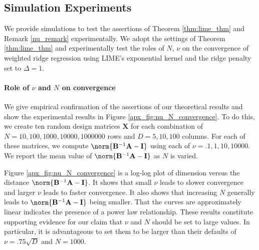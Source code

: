 \documentclass[mnsc,blindrev]{informs3}
\newcommand{\bA}{\mathbf{A}}
\newcommand{\bB}{\mathbf{B}}
\newcommand{\bI}{\mathbf{I}}
\begin{document}
            \subsection*{Simulation Experiments}
                \label{apx_sec:simulation_experiments}
                We provide simulations to test the assertions of Theorem \ref{thm:lime_thm} and Remark \ref{nu_remark} experimentally. We adopt the settings of Theorem \ref{thm:lime_thm} and experimentally test the roles of $N$, $\nu$ on the convergence of weighted ridge regression using LIME's exponential kernel and the ridge penalty set to $\Delta=1$.%
    

                
                \paragraph{Role of $\nu$ and $N$ on convergence}
                    We give empirical confirmation of the assertions of our theoretical results and show the experimental results in Figure \ref{apx_fig:nu_N_convergence}. To do this, we create ten random design matrices $\mathbf{X}$ for each combination of $N=10,100,1000,10000,1000000$ rows and $D=5,10,100$ columns. For each of these matrices, we compute $\norm{\bB^{-1}\bA - \mathbf{I}}$ using each of $\nu=.1,1,10,10000$. We report the mean value of $\norm{\bB^{-1}\bA - \mathbf{I}}$ as $N$ is varied.


                    Figure \ref{apx_fig:nu_N_convergence} is a log-log plot of dimension versus the distance $\norm{\bB^{-1}\bA - \mathbf{I}}$. It shows that small $\nu$ leads to slower convergence and larger $\nu$ leads to faster convergence. It also shows that increasing $N$ generally leads to $\norm{\bB^{-1}\bA - \bI}$ being smaller. That the curves are approximately linear indicates the presence of a power law relationship. These results constitute supporting evidence for our claim that $\nu$ and $N$ should be set to large values. In particular, it is advantageous to set them to be larger than their defaults of $\nu=.75\sqrt{D}$ and $N=1000$. 
                    
\end{document}
